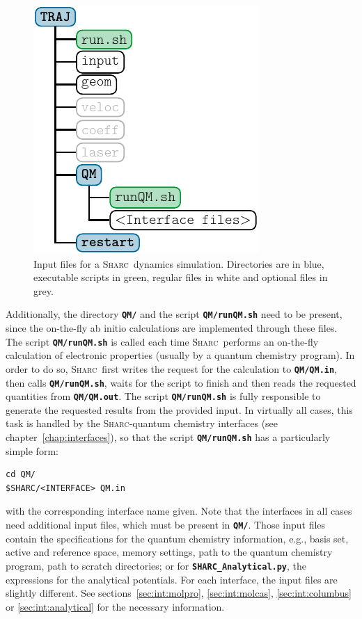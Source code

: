 \documentclass[a4paper,11pt,DIV=15,openany,twoside=false]{scrbook}
\newcommand{\sharc}{\textsc{Sharc}}
\newcommand{\ttt}[1]{\textbf{\texttt{#1}}}
\newenvironment{example}{
  \vspace{0mm}
  \definecolor{shadecolor}{HTML}{BBDDFF}
  \begin{shaded}
  \begin{minipage}{0.9\textwidth}
}{
  \end{minipage}
  \end{shaded}
}
\begin{document}
\begin{figure}[h!]
  \centering
  \includegraphics[scale=1]{img/dir_traj/dir_traj.pdf}
  \caption{Input files for a \sharc\ dynamics simulation. Directories are in blue, executable scripts in green, regular files in white and optional files in grey.}
  \label{fig:dir_traj}
\end{figure}

Additionally, the directory \ttt{QM/} and the script \ttt{QM/runQM.sh} need to be present, since the on-the-fly ab initio calculations are implemented through these files. The script \ttt{QM/runQM.sh} is called each time \sharc\ performs an on-the-fly calculation of electronic properties (usually by a quantum chemistry program). In order to do so, \sharc\ first writes the request for the calculation to \ttt{QM/QM.in}, then calls \ttt{QM/runQM.sh}, waits for the script to finish and then reads the requested quantities from \ttt{QM/QM.out}. The script \ttt{QM/runQM.sh} is fully responsible to generate the requested results from the provided input. 
In virtually all cases, this task is handled by the \sharc-quantum chemistry interfaces (see chapter~\ref{chap:interfaces}), so that the script \ttt{QM/runQM.sh} has a particularly simple form:
\begin{example}
  \begin{verbatim}
cd QM/
$SHARC/<INTERFACE> QM.in 
  \end{verbatim}
\end{example}
with the corresponding interface name given. Note that the interfaces in all cases need additional input files, which must be present in \ttt{QM/}. Those input files contain the specifications for the quantum chemistry information, e.g., basis set, active and reference space, memory settings, path to the quantum chemistry program, path to scratch directories; or for \ttt{SHARC\_Analytical.py}, the expressions for the analytical potentials. For each interface, the input files are slightly different. See sections~\ref{sec:int:molpro}, \ref{sec:int:molcas}, \ref{sec:int:columbus} or \ref{sec:int:analytical} for the necessary information.
\end{document}
